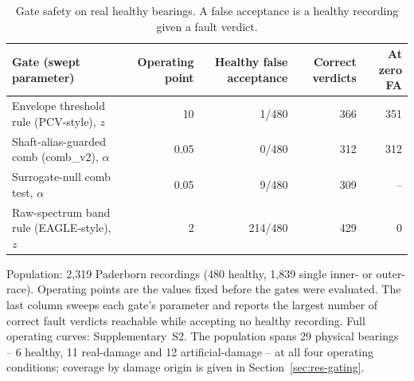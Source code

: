 \begin{table}[htbp]
\centering
\caption{Gate safety on real healthy bearings. A false acceptance is a healthy recording given a fault verdict.}
\label{tab:gates}
\small
\setlength{\tabcolsep}{4pt}
\begin{tabular}{lrrrr}
\toprule
Gate (swept parameter) & Operating point & Healthy false acceptance & Correct verdicts & At zero FA \\
\midrule
Envelope threshold rule (PCV-style), $z$ & 10 & 1/480 & 366 & 351 \\
Shaft-alias-guarded comb (comb\_v2), $\alpha$ & 0.05 & 0/480 & 312 & 312 \\
Surrogate-null comb test, $\alpha$ & 0.05 & 9/480 & 309 & -- \\
Raw-spectrum band rule (EAGLE-style), $z$ & 2 & 214/480 & 429 & 0 \\
\bottomrule
\end{tabular}
\begin{minipage}{\linewidth}\vspace{2pt}\footnotesize Population: 2{,}319 Paderborn recordings (480 healthy, 1{,}839 single inner- or outer-race). Operating points are the values fixed before the gates were evaluated. The last column sweeps each gate's parameter and reports the largest number of correct fault verdicts reachable while accepting no healthy recording. Full operating curves: Supplementary~S2. The population spans 29 physical bearings -- 6 healthy, 11 real-damage and 12 artificial-damage -- at all four operating conditions; coverage by damage origin is given in Section~\ref{sec:res-gating}.\end{minipage}
\end{table}
